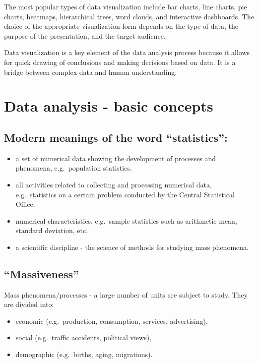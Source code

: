 \documentclass[
  english,
  letterpaper,
  DIV=11,
  numbers=noendperiod]{scrreprt}
\providecommand{\tightlist}{%
  \setlength{\itemsep}{0pt}\setlength{\parskip}{0pt}}
\begin{document}
The most popular types of data visualization include bar charts, line
charts, pie charts, heatmaps, hierarchical trees, word clouds, and
interactive dashboards. The choice of the appropriate visualization form
depends on the type of data, the purpose of the presentation, and the
target audience.

Data visualization is a key element of the data analysis process because
it allows for quick drawing of conclusions and making decisions based on
data. It is a bridge between complex data and human understanding.

\section{Data analysis - basic
concepts}\label{data-analysis---basic-concepts}

\subsection{Modern meanings of the word
``statistics'':}\label{modern-meanings-of-the-word-statistics}

\begin{itemize}
\tightlist
\item
  a set of numerical data showing the development of processes and
  phenomena, e.g.~population statistics.
\item
  all activities related to collecting and processing numerical data,
  e.g.~statistics on a certain problem conducted by the Central
  Statistical Office.
\item
  numerical characteristics, e.g.~sample statistics such as arithmetic
  mean, standard deviation, etc.
\item
  a scientific discipline - the science of methods for studying mass
  phenomena.
\end{itemize}

\subsection{``Massiveness''}\label{massiveness}

Mass phenomena/processes - a large number of units are subject to study.
They are divided into:

\begin{itemize}
\tightlist
\item
  economic (e.g.~production, consumption, services, advertising),
\item
  social (e.g.~traffic accidents, political views),
\item
  demographic (e.g.~births, aging, migrations).
\end{itemize}
\end{document}
